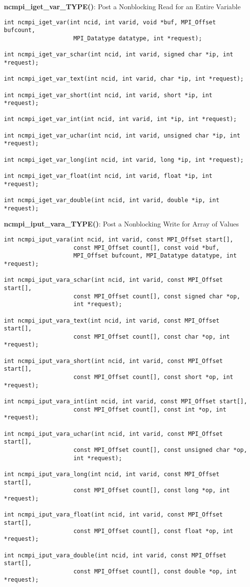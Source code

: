 {\bf ncmpi\_iget\_var\_TYPE()}: Post a Nonblocking Read for an Entire Variable

\begin{verbatim}
int ncmpi_iget_var(int ncid, int varid, void *buf, MPI_Offset bufcount,
                    MPI_Datatype datatype, int *request);

int ncmpi_iget_var_schar(int ncid, int varid, signed char *ip, int *request);

int ncmpi_iget_var_text(int ncid, int varid, char *ip, int *request);

int ncmpi_iget_var_short(int ncid, int varid, short *ip, int *request);

int ncmpi_iget_var_int(int ncid, int varid, int *ip, int *request);

int ncmpi_iget_var_uchar(int ncid, int varid, unsigned char *ip, int *request);

int ncmpi_iget_var_long(int ncid, int varid, long *ip, int *request);

int ncmpi_iget_var_float(int ncid, int varid, float *ip, int *request);

int ncmpi_iget_var_double(int ncid, int varid, double *ip, int *request);
\end{verbatim}


{\bf ncmpi\_iput\_vara\_TYPE()}: Post a Nonblocking Write for Array of Values

\begin{verbatim}
int ncmpi_iput_vara(int ncid, int varid, const MPI_Offset start[],
                    const MPI_Offset count[], const void *buf,
                    MPI_Offset bufcount, MPI_Datatype datatype, int *request); 

int ncmpi_iput_vara_schar(int ncid, int varid, const MPI_Offset start[],
                    const MPI_Offset count[], const signed char *op,
                    int *request); 

int ncmpi_iput_vara_text(int ncid, int varid, const MPI_Offset start[],
                    const MPI_Offset count[], const char *op, int *request); 

int ncmpi_iput_vara_short(int ncid, int varid, const MPI_Offset start[],
                    const MPI_Offset count[], const short *op, int *request); 

int ncmpi_iput_vara_int(int ncid, int varid, const MPI_Offset start[],
                    const MPI_Offset count[], const int *op, int *request); 

int ncmpi_iput_vara_uchar(int ncid, int varid, const MPI_Offset start[],
                    const MPI_Offset count[], const unsigned char *op,
                    int *request);

int ncmpi_iput_vara_long(int ncid, int varid, const MPI_Offset start[],
                    const MPI_Offset count[], const long *op, int *request);

int ncmpi_iput_vara_float(int ncid, int varid, const MPI_Offset start[],
                    const MPI_Offset count[], const float *op, int *request); 

int ncmpi_iput_vara_double(int ncid, int varid, const MPI_Offset start[],
                    const MPI_Offset count[], const double *op, int *request); 
\end{verbatim}


